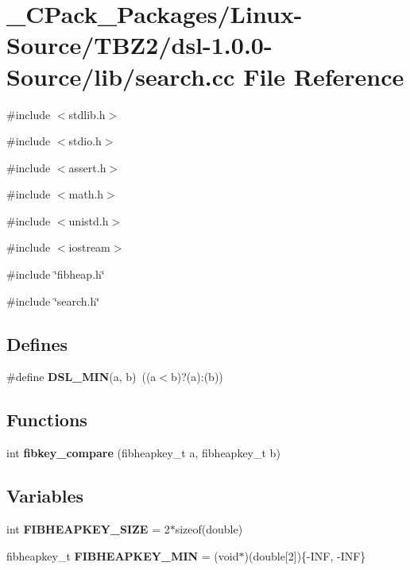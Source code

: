 \section{\_\-CPack\_\-Packages/Linux-\/Source/TBZ2/dsl-\/1.0.0-\/Source/lib/search.cc File Reference}
\label{__CPack__Packages_2Linux-Source_2TBZ2_2dsl-1_80_80-Source_2lib_2search_8cc}
{\ttfamily \#include $<$stdlib.h$>$}\par
{\ttfamily \#include $<$stdio.h$>$}\par
{\ttfamily \#include $<$assert.h$>$}\par
{\ttfamily \#include $<$math.h$>$}\par
{\ttfamily \#include $<$unistd.h$>$}\par
{\ttfamily \#include $<$iostream$>$}\par
{\ttfamily \#include \char`\"{}fibheap.h\char`\"{}}\par
{\ttfamily \#include \char`\"{}search.h\char`\"{}}\par
\subsection*{Defines}
\begin{DoxyCompactItemize}
\item 
\#define {\bf DSL\_\-MIN}(a, b)~((a$<$b)?(a):(b))
\end{DoxyCompactItemize}
\subsection*{Functions}
\begin{DoxyCompactItemize}
\item 
int {\bf fibkey\_\-compare} (fibheapkey\_\-t a, fibheapkey\_\-t b)
\end{DoxyCompactItemize}
\subsection*{Variables}
\begin{DoxyCompactItemize}
\item 
int {\bf FIBHEAPKEY\_\-SIZE} = 2$\ast$sizeof(double)
\item 
fibheapkey\_\-t {\bf FIBHEAPKEY\_\-MIN} = (void$\ast$)(double[2])\{-\/INF, -\/INF\}
\end{DoxyCompactItemize}


